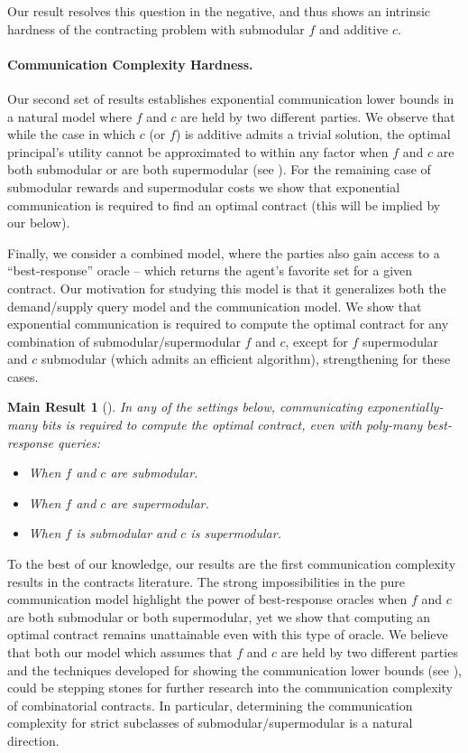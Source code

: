 \documentclass[11pt]{article}
\newtheorem{mainresult}{Main Result}
\begin{document}
Our result resolves this question in the negative, and thus shows an intrinsic hardness of the contracting problem with submodular $f$ and additive $c$.

\paragraph{Communication Complexity Hardness.}

Our second set of results establishes exponential communication lower bounds in a natural model where $f$ and $c$ are held by two different parties.
We observe that while the case in which $c$ (or $f$) is additive admits a trivial solution, the optimal principal's utility cannot be approximated to within any factor when $f$ and $c$ are both submodular or are both supermodular (see ). For the remaining case of submodular rewards and supermodular costs we show that exponential communication is required to find an optimal contract (this will be implied by our  below). 

Finally, we consider a combined model, where the parties also gain access to a ``best-response'' oracle -- which returns the agent's favorite set for a given contract.
Our motivation for studying this model is that it generalizes both the demand/supply query model and the communication model. We show that exponential communication is required to compute the optimal contract for any combination of submodular/supermodular $f$ and $c$, except for $f$ supermodular and $c$ submodular (which admits an efficient algorithm), strengthening  for these cases.

\begin{mainresult}[]\label{thm:main2}
In any of the settings below, communicating exponentially-many bits is required to compute the optimal contract, even with poly-many best-response queries:
\begin{itemize}\setlength\itemsep{-0.25em}
    \item When $f$ and $c$ are submodular.
    \item When $f$ and $c$ are supermodular.
    \item When $f$ is submodular and $c$ is supermodular.
\end{itemize}
\end{mainresult}

To the best of our knowledge, our results are the first communication complexity results in the contracts literature. The strong impossibilities in the pure communication model highlight the power of best-response oracles when $f$ and $c$ are both submodular or both supermodular, yet we show that computing an optimal contract remains unattainable even with this type of oracle.
We believe that both our model which assumes that $f$ and $c$ are held by two different parties and the techniques developed for showing the communication lower bounds (see ), could be stepping stones for further research into the communication complexity of combinatorial contracts. 
In particular, determining the communication complexity for strict subclasses of submodular/supermodular is a natural direction.
\end{document}
